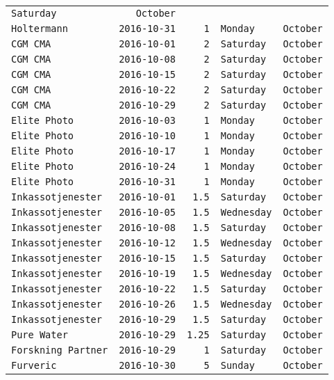 \documentclass[11pt,A4paper,]{article}
\begin{document}
\begin{longtable}[]{@{}lrrll@{}}
\texttt{Saturday} & \texttt{October}\tabularnewline
\texttt{Holtermann} & \texttt{2016-10-31} & \texttt{1} & \texttt{Monday}
& \texttt{October}\tabularnewline
\texttt{CGM\ CMA} & \texttt{2016-10-01} & \texttt{2} & \texttt{Saturday}
& \texttt{October}\tabularnewline
\texttt{CGM\ CMA} & \texttt{2016-10-08} & \texttt{2} & \texttt{Saturday}
& \texttt{October}\tabularnewline
\texttt{CGM\ CMA} & \texttt{2016-10-15} & \texttt{2} & \texttt{Saturday}
& \texttt{October}\tabularnewline
\texttt{CGM\ CMA} & \texttt{2016-10-22} & \texttt{2} & \texttt{Saturday}
& \texttt{October}\tabularnewline
\texttt{CGM\ CMA} & \texttt{2016-10-29} & \texttt{2} & \texttt{Saturday}
& \texttt{October}\tabularnewline
\texttt{Elite\ Photo} & \texttt{2016-10-03} & \texttt{1} &
\texttt{Monday} & \texttt{October}\tabularnewline
\texttt{Elite\ Photo} & \texttt{2016-10-10} & \texttt{1} &
\texttt{Monday} & \texttt{October}\tabularnewline
\texttt{Elite\ Photo} & \texttt{2016-10-17} & \texttt{1} &
\texttt{Monday} & \texttt{October}\tabularnewline
\texttt{Elite\ Photo} & \texttt{2016-10-24} & \texttt{1} &
\texttt{Monday} & \texttt{October}\tabularnewline
\texttt{Elite\ Photo} & \texttt{2016-10-31} & \texttt{1} &
\texttt{Monday} & \texttt{October}\tabularnewline
\texttt{Inkassotjenester} & \texttt{2016-10-01} & \texttt{1.5} &
\texttt{Saturday} & \texttt{October}\tabularnewline
\texttt{Inkassotjenester} & \texttt{2016-10-05} & \texttt{1.5} &
\texttt{Wednesday} & \texttt{October}\tabularnewline
\texttt{Inkassotjenester} & \texttt{2016-10-08} & \texttt{1.5} &
\texttt{Saturday} & \texttt{October}\tabularnewline
\texttt{Inkassotjenester} & \texttt{2016-10-12} & \texttt{1.5} &
\texttt{Wednesday} & \texttt{October}\tabularnewline
\texttt{Inkassotjenester} & \texttt{2016-10-15} & \texttt{1.5} &
\texttt{Saturday} & \texttt{October}\tabularnewline
\texttt{Inkassotjenester} & \texttt{2016-10-19} & \texttt{1.5} &
\texttt{Wednesday} & \texttt{October}\tabularnewline
\texttt{Inkassotjenester} & \texttt{2016-10-22} & \texttt{1.5} &
\texttt{Saturday} & \texttt{October}\tabularnewline
\texttt{Inkassotjenester} & \texttt{2016-10-26} & \texttt{1.5} &
\texttt{Wednesday} & \texttt{October}\tabularnewline
\texttt{Inkassotjenester} & \texttt{2016-10-29} & \texttt{1.5} &
\texttt{Saturday} & \texttt{October}\tabularnewline
\texttt{Pure\ Water} & \texttt{2016-10-29} & \texttt{1.25} &
\texttt{Saturday} & \texttt{October}\tabularnewline
\texttt{Forskning\ Partner} & \texttt{2016-10-29} & \texttt{1} &
\texttt{Saturday} & \texttt{October}\tabularnewline
\texttt{Furveric} & \texttt{2016-10-30} & \texttt{5} & \texttt{Sunday} &
\texttt{October}\tabularnewline

\end{longtable}
\end{document}
